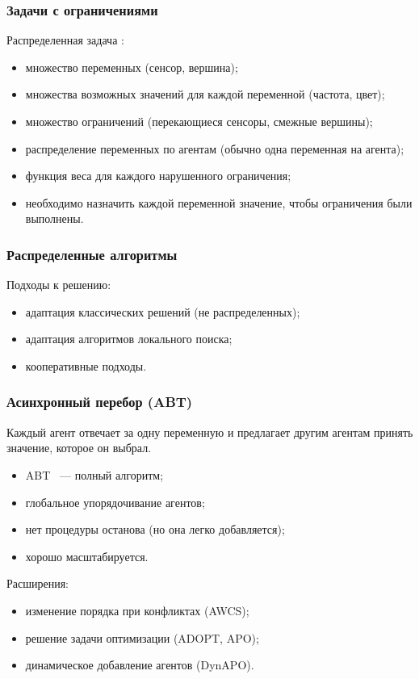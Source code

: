 \documentclass{beamer}
\begin{document}
\begin{frame}
  \frametitle{Задачи с ограничениями}
  Распределенная задача :
  \begin{itemize}
    \item множество переменных (сенсор, вершина);
    \item множества возможных значений для каждой переменной (частота, цвет);
    \item множество ограничений (перекающиеся сенсоры, смежные вершины);
    \item распределение переменных по агентам (обычно одна переменная на агента);
    \item<2-| alert@2> функция веса для каждого нарушенного ограничения;
    \item необходимо 
      {назначить каждой переменной значение, чтобы ограничения были выполнены}.
  \end{itemize}
\end{frame}

\begin{frame}
  \frametitle{Распределенные алгоритмы}
  Подходы к решению:

  \begin{itemize}
    \item адаптация классических решений (не распределенных);
    \item адаптация алгоритмов локального поиска;
    \item кооперативные подходы.
  \end{itemize}
\end{frame}

\begin{frame}
  \frametitle{Асинхронный перебор (ABT)}
  Каждый агент отвечает за одну переменную и предлагает другим агентам принять значение,
  которое он выбрал.
  \begin{itemize}
    \item ABT ~--- полный алгоритм;
    \item глобальное упорядочивание агентов;
    \item нет процедуры останова (но она легко добавляется);
    \item хорошо масштабируется.
  \end{itemize}

  Расширения:
  \begin{itemize}
    \item изменение порядка при конфликтах (AWCS);
    \item решение задачи оптимизации (ADOPT, APO);
    \item динамическое добавление агентов (DynAPO).
  \end{itemize}
\end{frame}
\end{document}
